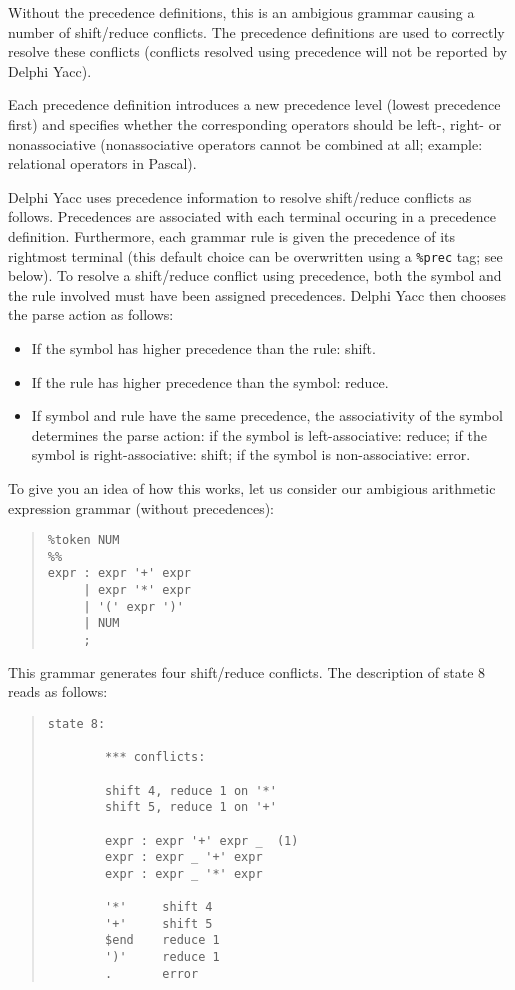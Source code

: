 \documentclass{article}
\begin{document}
Without the precedence definitions, this is an ambigious grammar causing
a number of shift/reduce conflicts. The precedence definitions are used
to correctly resolve these conflicts (conflicts resolved using precedence
will not be reported by Delphi Yacc).

Each precedence definition introduces a new precedence level (lowest
precedence first) and specifies whether the corresponding operators
should be left-, right- or nonassociative (nonassociative operators
cannot be combined at all; example: relational operators in Pascal).

Delphi Yacc uses precedence information to resolve shift/reduce conflicts as
follows. Precedences are associated with each terminal occuring in a
precedence definition. Furthermore, each grammar rule is given the
precedence of its rightmost terminal (this default choice can be
overwritten using a \verb"%prec" tag; see below). To resolve a shift/reduce
conflict using precedence, both the symbol and the rule involved must
have been assigned precedences. Delphi Yacc then chooses the parse action
as follows:

\begin{itemize}
   \item
      If the symbol has higher precedence than the rule: shift.
   \item
      If the rule has higher precedence than the symbol: reduce.
   \item
      If symbol and rule have the same precedence, the associativity of the
      symbol determines the parse action: if the symbol is left-associative:
      reduce; if the symbol is right-associative: shift; if the symbol is
      non-associative: error.
\end{itemize}

To give you an idea of how this works, let us consider our ambigious
arithmetic expression grammar (without precedences):

\begin{quote}\begin{verbatim}
%token NUM
%%
expr : expr '+' expr
     | expr '*' expr
     | '(' expr ')'
     | NUM
     ;
\end{verbatim}\end{quote}

This grammar generates four shift/reduce conflicts. The description
of state 8 reads as follows:

\begin{quote}\begin{verbatim}
state 8:

        *** conflicts:

        shift 4, reduce 1 on '*'
        shift 5, reduce 1 on '+'

        expr : expr '+' expr _  (1)
        expr : expr _ '+' expr
        expr : expr _ '*' expr

        '*'     shift 4
        '+'     shift 5
        $end    reduce 1
        ')'     reduce 1
        .       error
\end{verbatim}\end{quote}
\end{document}
